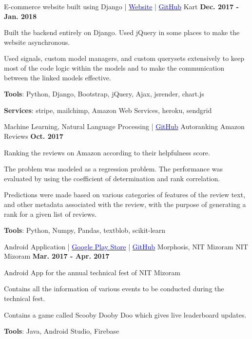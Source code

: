 \begin{cventries}
    \cventry
    {E-commerce website built using Django | \href{https://shan-kart.herokuapp.com/}{\textcolor{Blue}{Website}} | \href{https://github.com/shan18/Kart}{\textcolor{Blue}{GitHub}}}
    {Kart}
    {}
    {\textbf{Dec. 2017 - Jan. 2018}}
    {
        \begin{cvitems}
          \item{Built the backend entirely on Django. Used jQuery in some places to make the website asynchronous.}
          \item{Used signals, custom model managers, and custom querysets extensively to keep most of the code logic within the models and to make the communication between the linked models effective.}
          \item{\textbf{Tools}: Python, Django, Bootstrap, jQuery, Ajax, jsrender, chart.js}
          \item{\textbf{Services}: stripe, mailchimp, Amazon Web Services, heroku, sendgrid}
        \end{cvitems}
    }
    \cventry
    {Machine Learning, Natural Language Processing | \href{https://github.com/shan18/Autoranking-Amazon-Reviews}{\textcolor{Blue}{GitHub}}}
    {Autoranking Amazon Reviews}
    {}
    {\textbf{Oct. 2017}}
    {
      \begin{cvitems}
        \item{Ranking the reviews on Amazon according to their helpfulness score.}
        \item{The problem was modeled as a regression problem. The performance was evaluated by using the coefficient of determination and rank correlation.}
        \item{Predictions were made based on various categories of features of the review text, and other metadata associated with the review, with the purpose of generating a rank for a given list of reviews.}
        \item{\textbf{Tools}: Python, Numpy, Pandas, textblob, scikit-learn}
      \end{cvitems}
    }
    \cventry
    {Android Application | \href{https://play.google.com/store/apps/details?id=com.nitmz.morphosis&hl=en}{\textcolor{Blue}{Google Play Store}} | \href{https://github.com/morphosis-nitmz/Morphosis-2k17-Android}{\textcolor{Blue}{GitHub}}}
    {Morphosis, NIT Mizoram}
    {NIT Mizoram}
    {\textbf{Mar. 2017 - Apr. 2017}}
    {
      \begin{cvitems}
        \item {Android App for the annual technical fest of NIT Mizoram}
        \item{Contains all the information of various events to be conducted during the technical fest.}
        \item{Contains a game called Scooby Dooby Doo which gives live leaderboard updates.}
        \item{\textbf{Tools}: Java, Android Studio, Firebase}
      \end{cvitems}
    }
\end{cventries}  

